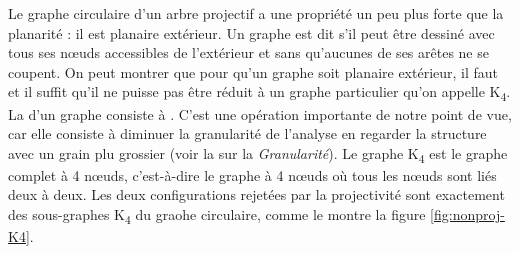 {    Le graphe circulaire d’un arbre projectif a une propriété un peu plus forte que la planarité : il est planaire extérieur.
     {Un graphe est dit  s’il peut être dessiné avec tous ses nœuds accessibles de l’extérieur et sans qu’aucunes de ses arêtes ne se coupent.}
   On peut montrer que pour qu’un graphe soit planaire extérieur, il faut et il suffit qu’il ne puisse pas être réduit à un graphe particulier qu’on appelle K\textsubscript{4}. La  d’un graphe consiste à . C’est une opération importante de notre point de vue, car elle consiste à diminuer la granularité de l'analyse en regarder la structure avec un grain plu grossier (voir la  sur la \textit{Granularité}). Le graphe K\textsubscript{4} est le graphe complet à 4 nœuds, c’est-à-dire le graphe à 4 nœuds où tous les nœuds sont liés deux à deux. Les deux configurations rejetées par la projectivité sont exactement des sous-graphes K\textsubscript{4} du graohe circulaire, comme le montre la figure \ref{fig:nonproj-K4}.
   
}
